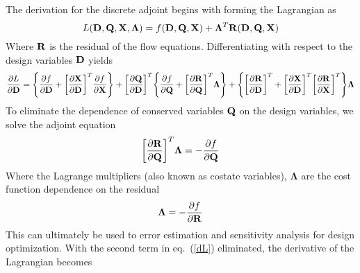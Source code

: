 The derivation for the discrete adjoint begins with forming the Lagrangian as
\begin{equation}
  L(\mathbf D,\mathbf Q,\mathbf X,\mathbf{\Lambda})=f(\mathbf D,\mathbf Q,\mathbf X)
  +\mathbf{\Lambda}^T\mathbf R(\mathbf D,\mathbf Q,\mathbf X)
\end{equation}
Where $\mathbf R$ is the residual of the flow equations.  Differentiating with respect
to the design variables $\mathbf D$ yields
\begin{equation}
  \frac{\partial L}{\partial \mathbf D}=
  \Bigg\{\frac{\partial f}{\partial \mathbf D}+\bigg[\frac{\partial \mathbf X}{\partial \mathbf D}\bigg]^T \frac{\partial f}{\partial \mathbf X}\Bigg\}
  +\bigg[\frac{\partial \mathbf Q}{\partial \mathbf D}\bigg]^T
  \Bigg\{\frac{\partial f}{\partial \mathbf Q}+\bigg[\frac{\partial \mathbf R}{\partial \mathbf Q}\bigg]^T \mathbf{\Lambda}\Bigg\}
  +\Bigg\{\bigg[\frac{\partial \mathbf R}{\partial \mathbf D}\bigg]^T
  +\bigg[\frac{\partial \mathbf X}{\partial \mathbf D}\bigg]^T\bigg[\frac{\partial \mathbf R}{\partial \mathbf X}\bigg]^T\Bigg\}\mathbf{\Lambda}
  \label{dL}
\end{equation}
To eliminate the dependence of conserved variables $\mathbf Q$ on the design
variables, we solve the adjoint equation
\begin{equation}
  \bigg[\frac{\partial \mathbf R}{\partial \mathbf Q}\bigg]^T\mathbf{\Lambda}=
  -\frac{\partial f}{\partial \mathbf Q}
  \label{adjoint-main}
\end{equation}
Where the Lagrange multipliers (also known as costate variables),
$\mathbf{\Lambda}$ are the cost function dependence on the residual
\begin{equation}
  \mathbf{\Lambda}=-\frac{\partial f}{\partial \mathbf R}
\end{equation}
This can ultimately be used to error estimation and sensitivity analysis for
design optimization.  With the second term in eq.~(\ref{dL}) eliminated, the
derivative of the Lagrangian becomes
